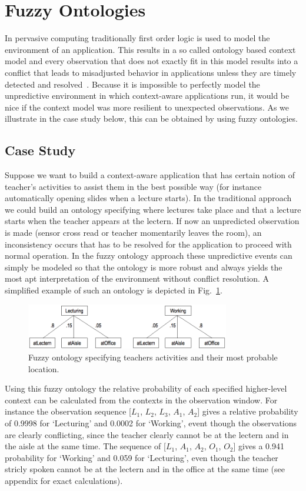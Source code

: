 \documentclass[journal]{vgtc}                %
\begin{document}
\section{Fuzzy Ontologies}
In pervasive computing traditionally first order logic is used to model the environment of an application. This results in a so called ontology based context model and every observation that does not exactly fit in this model results into a conflict that leads to misadjusted behavior in applications unless they are timely detected and resolved~\cite{xu:2010:PCC}. Because it is impossible to perfectly model the unpredictive environment in which context-aware applications run, it would be nice if the context model was more resilient to unexpected observations. As we illustrate in the case study below, this can be obtained by using fuzzy ontologies.
\subsection{Case Study}
Suppose we want to build a context-aware application that has certain notion of teacher's activities to assist them in the best possible way (for instance automatically opening slides when a lecture starts). In the traditional approach we could build an ontology specifying where lectures take place and that a lecture starts when the teacher appears at the lectern. If now an unpredicted observation is made (sensor cross read or teacher momentarily leaves the room), an inconsistency occurs that has to be resolved for the application to proceed with normal operation. In the fuzzy ontology approach these unpredictive events can simply be modeled so that the ontology is more robust and always yields the most apt interpretation of the environment without conflict resolution. A simplified example of such an ontology is depicted in Fig.~\ref{fig:fuzzy}.
\begin{figure}[htb]
  \centering
  \includegraphics[width=3.5in]{fuzzy}
  \caption{Fuzzy ontology specifying teachers activities and their most probable location.}
  \label{fig:fuzzy}
\end{figure}
Using this fuzzy ontology the relative probability of each specified higher-level context can be calculated from the contexts in the observation window. For instance the observation sequence [$L_1$, $L_2$, $L_3$, $A_1$, $A_2$] gives a relative probability of 0.9998 for `Lecturing' and 0.0002 for `Working', event though the observations are clearly conflicting, since the teacher clearly cannot be at the lectern and in the aisle at the same time. The sequence of [$L_1$, $A_1$, $A_2$, $O_1$, $O_2$] gives a 0.941 probability for `Working' and 0.059 for `Lecturing', even though the teacher stricly spoken cannot be at the lectern and in the office at the same time (see appendix for exact calculations). 
\end{document}
